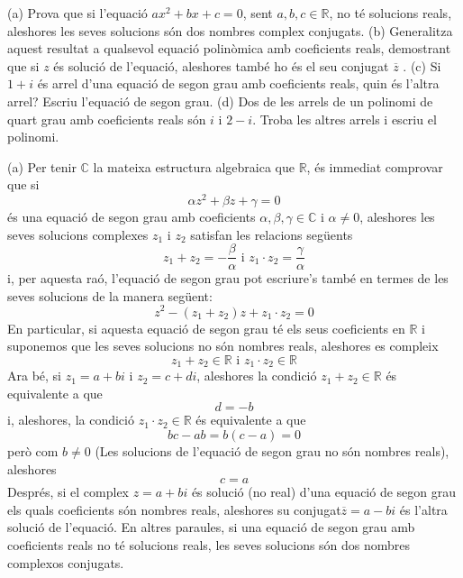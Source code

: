 \begin{exemple}
(a) Prova que si l’equació $ax^{2}+bx+c=0$, sent $a,b,c\in \mathbb{R
}$, no té solucions reals, aleshores les seves solucions són dos nombres
complex conjugats. (b) Generalitza aquest resultat a qualsevol equació
polinòmica amb coeficients reals, demostrant que si $z$ és solució de l’equació, aleshores també ho és el seu conjugat $\overline{z}$
. (c) Si $1+i$ és arrel d’una equació de segon grau amb
coeficients reals, quin és l’altra arrel?
Escriu l’equació de segon grau. (d) Dos de les arrels de un
polinomi de quart grau amb coeficients reals són $i$ i $2-i$. Troba les
altres arrels i escriu el polinomi.
\end{exemple}

\begin{solucio}
(a) Per tenir $\mathbb{C}$ la mateixa estructura algebraica que $\mathbb{R}$,
és immediat comprovar que si
\begin{equation*}
\alpha z^{2}+\beta z+\gamma =0
\end{equation*}
és una equació de segon grau amb coeficients $\alpha ,\beta ,\gamma
\in \mathbb{C}$ i $\alpha \neq 0$, aleshores les seves solucions complexes $z_{1}$
i $z_{2}$ satisfan les relacions següents
\begin{equation*}
z_{1}+z_{2}=-\frac{\beta }{\alpha }\text{ \ \ i \ \ }z_{1}\cdot z_{2}=\frac{
\gamma }{\alpha }
\end{equation*}
i, per aquesta raó, l’equació de segon grau pot escriure’s
també en termes de les seves solucions de la manera següent:
\begin{equation*}
z^{2}-(z_{1}+z_{2})z+z_{1}\cdot z_{2}=0
\end{equation*}
En particular, si aquesta equació de segon grau té els seus coeficients
en $\mathbb{R}$ i suponemos que les seves solucions no són nombres reals,
aleshores es compleix
\begin{equation*}
z_{1}+z_{2}\in \mathbb{R}\text{ \ \ \ i \ \ \ }z_{1}\cdot z_{2}\in \mathbb{R}
\end{equation*}
Ara bé, si $z_{1}=a+bi$ i $z_{2}=c+di$, aleshores la condició $
z_{1}+z_{2}\in \mathbb{R}$ és equivalente a que
\begin{equation*}
d=-b
\end{equation*}
i, aleshores, la condició $z_{1}\cdot z_{2}\in \mathbb{R}$ és
equivalente a que
\begin{equation*}
bc-ab=b(c-a)=0
\end{equation*}
però com $b\neq 0$ (Les solucions de l’equació de segon grau no
són nombres reals), aleshores
\begin{equation*}
c=a
\end{equation*}
Després, si el complex $z=a+bi$ és solució (no real) d’una equació
de segon grau els quals coeficients són nombres reals, aleshores su
conjugat\thinspace $\overline{z}=a-bi$ és l’altra solució de l’equació. En altres paraules, si una equació de segon grau amb
coeficients reals no té solucions reals, les seves solucions són dos nombres complexos conjugats.


\end{solucio}
